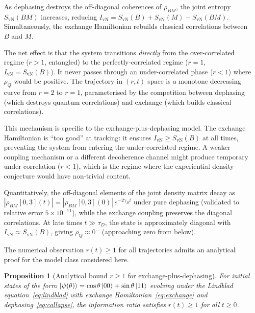 \documentclass[12pt,a4paper]{article}
\newtheorem{proposition}{Proposition}
\newcommand{\SvN}{S_{\mathrm{vN}}}
\newcommand{\IvN}{I_{\mathrm{vN}}}
\newcommand{\rhoQ}{\rho_Q}
\begin{document}
As dephasing destroys the off-diagonal coherences of $\rho_{BM}$,
the joint entropy $\SvN(BM)$ increases, reducing $\IvN = \SvN(B) +
\SvN(M) - \SvN(BM)$.  Simultaneously, the exchange Hamiltonian
rebuilds classical correlations between $B$ and $M$.

The net effect is that the system transitions \emph{directly} from
the over-correlated regime ($r > 1$, entangled) to the
perfectly-correlated regime ($r = 1$, $\IvN = \SvN(B)$).  It never
passes through an under-correlated phase ($r < 1$) where $\rhoQ$
would be positive.  The trajectory in $(r, t)$ space is a monotone
decreasing curve from $r = 2$ to $r = 1$, parameterised by the
competition between dephasing (which destroys quantum correlations)
and exchange (which builds classical correlations).

This mechanism is specific to the exchange-plus-dephasing model.
The exchange Hamiltonian is ``too good'' at tracking: it ensures
$\IvN \ge \SvN(B)$ at all times, preventing the system from
entering the under-correlated regime.  A weaker coupling mechanism
or a different decoherence channel might produce temporary
under-correlation ($r < 1$), which is the regime where the
experiential density conjecture would have non-trivial content.

Quantitatively, the off-diagonal elements of the joint density
matrix decay as $|\rho_{BM}[0,3](t)| = |\rho_{BM}[0,3](0)|\,
e^{-2\gamma_D t}$ under pure dephasing (validated to relative error
$5 \times 10^{-11}$), while the exchange coupling preserves the
diagonal correlations.  At late times $t \gg \tau_D$, the state is
approximately diagonal with $\IvN \approx \SvN(B)$, giving
$\rhoQ \approx 0^{-}$ (approaching zero from below).

The numerical observation $r(t) \ge 1$ for all trajectories admits
an analytical proof for the model class considered here.

\begin{proposition}[Analytical bound $r \ge 1$ for
exchange-plus-dephasing]\label{prop:r-bound}
  For initial states of the form
  $\ket{\psi(\theta)} = \cos\theta\ket{00} + \sin\theta\ket{11}$
  evolving under the Lindblad equation~\eqref{eq:lindblad} with
  exchange Hamiltonian~\eqref{eq:exchange} and
  dephasing~\eqref{eq:collapse}, the information ratio satisfies
  $r(t) \ge 1$ for all $t \ge 0$.
\end{proposition}
\end{document}
